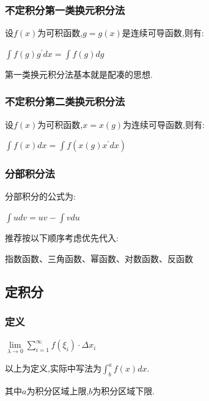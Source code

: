 \documentclass[UTF8,12pt]{ctexbook}
\newcommand{\limNormal}[1]{\lim\limits_{#1}}
\newcommand{\derivative}{^\prime}
\newcommand{\upDownSum}[2]{\sum\limits_{#2}^{#1}}
\newcommand{\defFunction}[1]{f(#1)}
\newcommand{\definiteIntegral}[2]{\int^{#1}_{#2}}
\begin{document}
{{{{  }%

  \subsubsection{不定积分第一类换元积分法}{
    设$\defFunction{x}$为可积函数,$g = g(x)$是连续可导函数,则有:

    $\int \defFunction{g}g\derivative dx = \int \defFunction{g}dg$

    第一类换元积分法基本就是配凑的思想.

  }%

  \subsubsection{不定积分第二类换元积分法}{
    设$\defFunction{x}$为可积函数,$x = x(g)$为连续可导函数,则有:

    $\int \defFunction{x}dx = \int \defFunction{x(g)x\derivative dx}$

  }%

  \subsubsection{分部积分法}{
    分部积分的公式为:

    $\int udv = uv - \int v du$

    推荐按以下顺序考虑优先代入:

    指数函数、三角函数、幂函数、对数函数、反函数
  }%

}%

\subsection{定积分}{

\subsubsection{定义}{
  $\limNormal{\lambda \to 0}\upDownSum{\infty}{i = 1}\defFunction{\xi_i}\cdot\Delta x_i$

  以上为定义,实际中写法为$\definiteIntegral{a}{b}\defFunction{x}dx$.

  其中$a$为积分区域上限,$b$为积分区域下限.
}%

}}}
\end{document}
